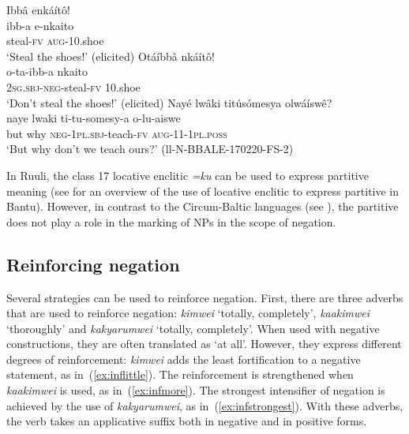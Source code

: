 \documentclass[output=paper,colorlinks,citecolor=brown,draftmode]{langscibook}
\begin{document}
\ea \label{ex:markingnps}
\begin{xlist}
\ex \label{ex:withaug}
	\glll  Ibbâ enkáítô!\\
	        ibb-a e-nkaito\\
	    	steal-\textsc{fv} \textsc{aug}-10.shoe\\
	\glt ‘Steal the shoes!’  (elicited)
\ex \label{ex:withoutaug}
	\glll   Otáíbbâ nkáítô!\\
	        o-ta-ibb-a nkaito\\
	    	\textsc{2sg.sbj}-\textsc{neg}-steal-\textsc{fv} 10.shoe\\
    \glt `Don't steal the shoes!’ (elicited)
\ex \label{ex:negwithaug}
	\glll   Nayé lwâki titúsómesya olwáíswê?\\
	        naye lwaki ti-tu-somesy-a o-lu-aiswe\\
	    	but why \textsc{neg}-1\textsc{pl.sbj}-teach-\textsc{fv} \textsc{aug}-11-1\textsc{pl.poss}\\
    \glt `But why don't we teach ours?’ (ll-N-BBALE-170220-FS-2)
\end{xlist}
\z

In Ruuli, the class 17 locative enclitic \textit{=ku} can be used to express partitive meaning (see \citealt{PersohnDevos2017} for an overview of the use of locative enclitic to express partitive in Bantu). 
However, in contrast to the Circum-Baltic languages (see \citealt{Miestamo2014}), the partitive does not play a role in the marking of NPs in the scope of negation.

\subsection{Reinforcing negation}
\label{sec:reinforcingruuli}

Several strategies can be used to reinforce negation. 
First, there are three adverbs that are used to reinforce negation: \textit{kimwei} `totally, completely', \textit{kaakimwei} `thoroughly' and \textit{kakyarumwei} `totally, completely'. 
When used with negative constructions, they are often translated as `at all'. 
However, they express different degrees of reinforcement: \textit{kimwei} adds the least fortification to a negative statement, as in~(\ref{ex:inflittle}). 
The reinforcement is strengthened when \textit{kaakimwei} is used, as in~(\ref{ex:infmore}). 
The strongest intensifier of negation is achieved by the use of \textit{ka\-kyarumwei}, as in~(\ref{ex:infstrongest}). 
With these adverbs, the verb takes an applicative suffix both in negative and in positive forms.
\end{document}
